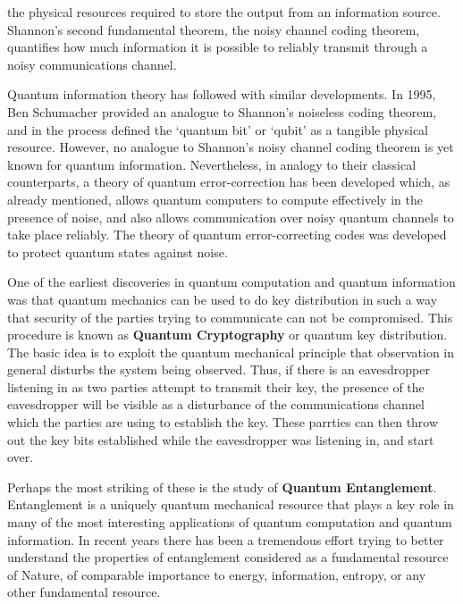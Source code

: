 \documentclass[20pt]{report}
\begin{document}
the physical resources required to store the output from an information source. Shannon’s second fundamental theorem, the noisy channel coding theorem, quantifies how much information it is possible to reliably transmit through a noisy communications channel.
\par
Quantum information theory has followed with similar developments. In 1995, Ben Schumacher provided an analogue to Shannon’s noiseless coding theorem, and in the process defined the ‘quantum bit’ or ‘qubit’ as a tangible physical resource. However, no analogue to Shannon’s noisy channel coding theorem is yet known for quantum information. Nevertheless, in analogy to their classical counterparts, a theory of quantum error-correction has been developed which, as already mentioned, allows quantum computers to compute effectively in the presence of noise, and also allows communication over noisy quantum channels to take place reliably. The theory of quantum error-correcting codes was developed to protect quantum states
against noise.
\par
One of the earliest discoveries in quantum computation and quantum information was that quantum mechanics can be used to do key distribution in such a way that security of the parties trying to communicate can not be compromised. This procedure is known as \textbf{Quantum Cryptography} or quantum key distribution. The basic idea is to exploit the quantum mechanical principle that observation in general disturbs the system being observed. Thus, if there is an eavesdropper listening in as two parties attempt to transmit their key, the presence of the eavesdropper will be visible as a disturbance of the communications channel which the parties are using to establish the key. These parrties can then throw out the key bits established while the eavesdropper was listening in, and start over.
\par
Perhaps the most striking of these is the study of \textbf{Quantum Entanglement}. Entanglement is a uniquely quantum mechanical resource that plays a key role in many of the most interesting applications of quantum computation and quantum information. In recent years there has been a tremendous effort trying to better understand the properties of entanglement considered as a fundamental resource of Nature, of comparable importance to energy, information, entropy, or any other fundamental resource.
\end{document}
